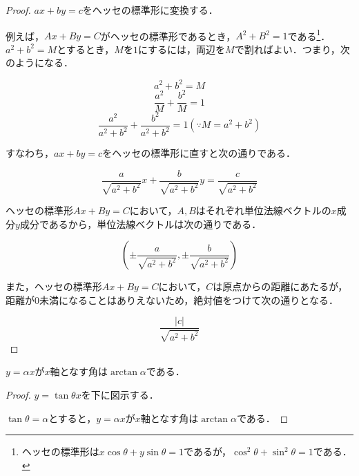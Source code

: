 \begin{proof}
  $ax + by = c$をヘッセの標準形に変換する．

  例えば，$Ax + By = C$がヘッセの標準形であるとき，$A^2 + B^2 = 1$である\footnote{ヘッセの標準形は$x \cos\theta + y \sin\theta = 1$であるが，$\cos^2 \theta + \sin^2 \theta = 1$である．}．$a^2 + b^2 = M$とするとき，$M$を$1$にするには，両辺を$M$で割ればよい．つまり，次のようになる．

  \[
    a^2 + b^2 = M
  \]
  \[
    \frac{a^2}{M} + \frac{b^2}{M} = 1
  \]
  \[
    \frac{a^2}{a^2 + b^2} + \frac{b^2}{a^2 + b^2} = 1 (\because M = a^2 + b^2)
  \]

  すなわち，$ax + by = c$をヘッセの標準形に直すと次の通りである．

  \[
    \frac{a}{\sqrt{a^2 + b^2}} x + \frac{b}{\sqrt{a^2 + b^2}} y = \frac{c}{\sqrt{a^2 + b^2}}
  \]

  ヘッセの標準形$Ax + By = C$において，$A, B$はそれぞれ単位法線ベクトルの$x$成分$y$成分であるから，単位法線ベクトルは次の通りである．

  \[
    (\pm \frac{a}{\sqrt{a^2 + b^2}}, \pm \frac{b}{\sqrt{a^2 + b^2}})
  \]

  また，ヘッセの標準形$Ax + By = C$において，$C$は原点からの距離にあたるが，距離が$0$未満になることはありえないため，絶対値をつけて次の通りとなる．

  \[
    \frac{|c|}{\sqrt{a^2 + b^2}}
  \]
\end{proof}

\begin{theorem}
  $y = \alpha x$が$x$軸となす角は$\arctan \alpha$である．
\end{theorem}

\begin{proof}
  $y=\tan\theta x$を下に図示する．

  \begin{center}
  \end{center}

  $\tan\theta = \alpha$とすると，$y = \alpha x$が$x$軸となす角は$\arctan \alpha$である．
\end{proof}
